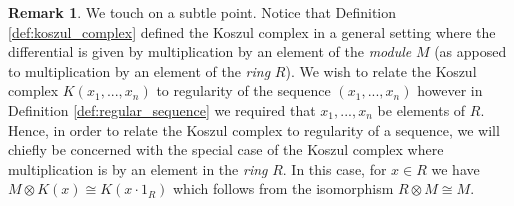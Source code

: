\documentclass[12pt]{article}
\theoremstyle{plain}
\theoremstyle{definition}
\newtheorem{remark}[thm]{Remark}
\begin{document}
\begin{remark}\label{rmk:where_mult}
We touch on a subtle point. Notice that Definition \ref{def:koszul_complex} defined the Koszul complex in a general setting where the differential is given by multiplication by an element of the \emph{module} $M$ (as apposed to multiplication by an element of the \emph{ring} $R$). We wish to relate the Koszul complex $K(x_1,...,x_n)$ to regularity of the sequence $(x_1,...,x_n)$ however in Definition \ref{def:regular_sequence} we required that $x_1,...,x_n$ be elements of $R$. Hence, in order to relate the Koszul complex to regularity of a sequence, we will chiefly be concerned with the special case of the Koszul complex where multiplication is by an element in the \emph{ring} $R$. In this case, for $x \in R$ we have $M \otimes K(x) \cong K(x\cdot 1_R)$ which follows from the isomorphism $R \otimes M \cong M$.
\end{remark}
\end{document}
